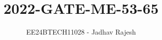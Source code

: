 \documentclass[journal]{IEEEtran}
\begin{document}

\vspace{3cm}
\title{2022-GATE-ME-53-65}
\author{EE24BTECH11028 - Jadhav Rajesh}
{\let\newpage\relax\maketitle}

\renewcommand{\thefigure}{\theenumi}
\renewcommand{\thetable}{\theenumi}
\setlength{\intextsep}{10pt} %


\renewcommand{\thetable}{\theenumi}
\end{document}

